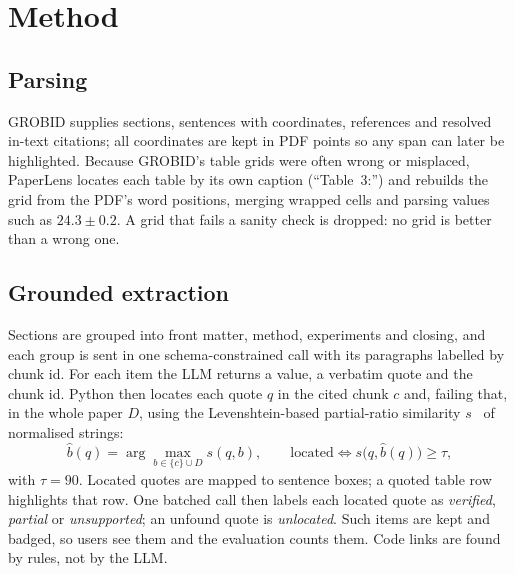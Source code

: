 \documentclass[conference]{IEEEtran}
\begin{document}
\section{Method}

\subsection{Parsing}\label{sec:parse}
GROBID supplies sections, sentences with coordinates, references and resolved in-text
citations; all coordinates are kept in PDF points so any span can later be highlighted.
Because GROBID's table grids were often wrong or misplaced, PaperLens locates each table by
its own caption (``Table~3:'') and rebuilds the grid from the PDF's word positions, merging
wrapped cells and parsing values such as $24.3\pm0.2$. A grid that fails a sanity check is
dropped: no grid is better than a wrong one.

\subsection{Grounded extraction}
Sections are grouped into front matter, method, experiments and closing, and each group is
sent in one schema-constrained call with its paragraphs labelled by chunk id. For each item
the LLM returns a value, a verbatim quote and the chunk id. Python then locates each quote
$q$ in the cited chunk $c$ and, failing that, in the whole paper $D$, using the
Levenshtein-based partial-ratio similarity $s$~\cite{levenshtein1966} of normalised strings:
\begin{equation}
  \hat b(q) = \arg\max_{b \in \{c\} \cup D} s(q, b), \qquad
  \text{located} \iff s\bigl(q,\hat b(q)\bigr) \geq \tau ,
\end{equation}
with $\tau = 90$. Located quotes are mapped to sentence boxes; a quoted table row
highlights that row. One batched call then labels each located quote as
\emph{verified}, \emph{partial} or \emph{unsupported}; an unfound quote is
\emph{unlocated}. Such items are kept and badged, so users see them and the evaluation
counts them. Code links are found by rules, not by the LLM.
\end{document}
